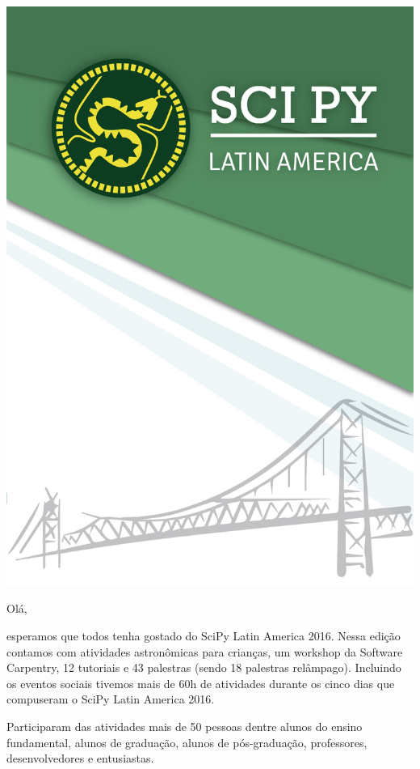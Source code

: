 \documentclass[12pt]{article}
\begin{document}
\thispagestyle{empty}
\noindent  %
\includegraphics{../../assets/capa}
\NoBgThispage

\clearpage

\restoregeometry

\newpage

Olá,

esperamos que todos tenha gostado do SciPy Latin America 2016.
Nessa edição contamos com atividades astronômicas para crianças,
um workshop da Software Carpentry,
12 tutoriais e 43 palestras (sendo 18 palestras relâmpago).
Incluindo os eventos sociais tivemos mais de 60h de atividades durante os cinco
dias que compuseram o SciPy Latin America 2016.

Participaram das atividades mais de 50 pessoas dentre
alunos do ensino fundamental,
alunos de graduação,
alunos de pós-graduação,
professores,
desenvolvedores
e entusiastas.
\end{document}
